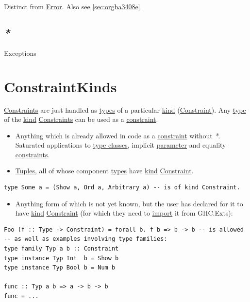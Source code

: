 \documentclass[a4paper,14pt,oneside]{book}
\begin{document}
Distinct from \hyperref[org6ab16b0]{Error}. Also see \ref{sec:orgba3408e}

\section{\emph{*}}
\label{sec:org9a72e48}

\label{org03a0cb5}Exceptions

\chapter{\label{org8086c7f}ConstraintKinds}
\label{sec:orgc51e0e9}
\hyperref[org32bf4d2]{Constraints} are just handled as \hyperref[orgdc24166]{types} of a particular \hyperref[org03a1bca]{kind} (\hyperref[org9ffefd3]{Constraint}).
Any \hyperref[orgb42397c]{type} of the \hyperref[org03a1bca]{kind} \hyperref[org32bf4d2]{Constraints} can be used as a \hyperref[org9ffefd3]{constraint}.
\begin{itemize}
\item Anything which is already allowed in code as a \hyperref[org9ffefd3]{constraint} without \emph{*}. Saturated applications to \hyperref[org912c1c1]{type classes}, implicit \hyperref[orgd0ae2ae]{parameter} and equality \hyperref[org32bf4d2]{constraints}.
\item \hyperref[orgfc9e392]{Tuples}, all of whose component \hyperref[orgdc24166]{types} have \hyperref[org03a1bca]{kind} \hyperref[org9ffefd3]{Constraint}.
\end{itemize}
\begin{verbatim}
type Some a = (Show a, Ord a, Arbitrary a) -- is of kind Constraint.
\end{verbatim}
\begin{itemize}
\item Anything form of which is not yet known, but the user has declared for it to have \hyperref[org03a1bca]{kind} \hyperref[org9ffefd3]{Constraint} (for which they need to \hyperref[org5475b8f]{import} it from GHC.Exts):
\end{itemize}
\begin{verbatim}
Foo (f :: Type -> Constraint) = forall b. f b => b -> b -- is allowed
-- as well as examples involving type families:
type family Typ a b :: Constraint
type instance Typ Int  b = Show b
type instance Typ Bool b = Num b

func :: Typ a b => a -> b -> b
func = ...
\end{verbatim}
\end{document}
